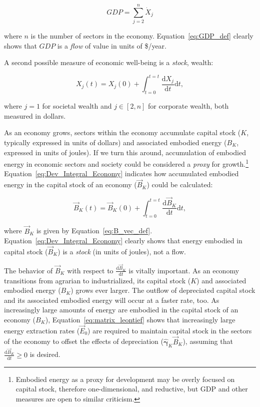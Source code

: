 \begin{equation} \label{eq:GDP_def}
	GDP
	= \sum\limits_{j=2}^{n} \dot{X}_{j}
\end{equation}

\noindent{}where $n$ is the number of sectors in the economy.
Equation~\ref{eq:GDP_def} clearly shows that 
$GDP$ is a \emph{flow} of value in units of \$/year.

A second possible measure of economic well-being is a \emph{stock}, 
wealth:

\begin{equation} \label{eq:Dev_Integral_Wealth}
	X_{j}(t) 
	= X_{j}(0) 
	+ \int_{t=0}^{t=t} \frac{\mathrm{d}X_{j}}{\mathrm{d}t}\mathrm{d}t,
\end{equation}

\noindent{}where $j=1$ for societal wealth 
and $j \in [2,n]$ for corporate wealth, both measured in dollars.

As an economy grows,
sectors within the economy accumulate capital stock 
($K$, typically expressed in units of dollars)
and associated embodied energy 
($B_{K}$, expressed in units of joules).
If we turn this around, 
accumulation of embodied energy in economic sectors and society 
could be considered a \emph{proxy} for growth.\footnote{Embodied energy 
	as a proxy for development may be overly focused on capital stock, 
	therefore one-dimensional, and reductive, 
	but GDP and other measures are open to similar criticism.}
Equation~\ref{eq:Dev_Integral_Economy} indicates how accumulated
embodied energy in the capital stock 
of an economy ($\vec{B}_{K}$) could be calculated:

\begin{equation} \label{eq:Dev_Integral_Economy}
	\vec{B}_{K}(t) 
	= \vec{B}_{K}(0) 
	+ \int_{t=0}^{t=t} \frac{\mathrm{d}\vec{B}_{K}}{\mathrm{d}t}\mathrm{d}t,
\end{equation}

\noindent{}where $\vec{B}_{K}$ is given by Equation~\ref{eq:B_vec_def}.
Equation~\ref{eq:Dev_Integral_Economy} clearly shows
that energy embodied in capital stock ($\vec{B}_{K}$) 
is a \emph{stock} (in units of joules), not a flow.

The behavior of $\vec{B}_{K}$ 
with respect to
$\frac{\mathrm{d}\vec{B}_{K}}{\mathrm{d}t}$ 
is vitally important. 
As an economy transitions from agrarian to industrialized, 
its capital stock ($K$) and associated embodied energy ($B_{K}$)
grows ever larger. 
The outflow of depreciated capital stock and its associated embodied energy 
will occur at a faster rate, too.
As increasingly large amounts of energy are embodied 
in the capital stock of an economy ($B_{K}$), 
Equation~\ref{eq:matrix_leontief} shows that
increasingly large energy extraction rates ($\vec{E}_{0}$) 
are required to maintain capital stock 
in the sectors of the economy
to offset the effects of depreciation 
($\hat{\boldsymbol{\gamma}}_{K} \vec{B}_{K}$),
assuming that $\frac{\mathrm{d}\vec{B}_{K}}{\mathrm{d}t} \ge 0$ 
is desired. 

